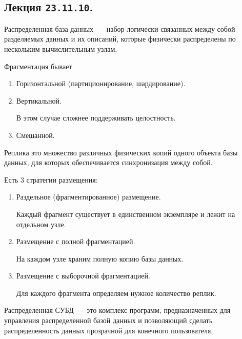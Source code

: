 \subsection{%
  Лекция \texttt{23.11.10}.%
}

\begin{definition}
  Распределенная база данных~--- набор логически связанных между собой
  разделяемых данных и их описаний, которые физически распределены по нескольким
  вычислительным узлам.
\end{definition}

Фрагментация бывает

\begin{enumerate}
\item
  Горизонтальной (партиционирование, шардирование).

\item
  Вертикальной.
  
  В этом случае сложнее поддерживать целостность.

\item
  Смешанной.
\end{enumerate}

\begin{definition}
  Реплика это множество различных физических копий одного объекта базы данных,
  для которых обеспечивается синхронизация между собой.
\end{definition}

Есть \(3\) стратегии размещения:

\begin{enumerate}
\item
  Раздельное (фрагментированное) размещение.

  Каждый фрагмент существует в единственном экземпляре и лежит на отдельном
  узле.

\item
  Размещение с полной фрагментацией.

  На каждом узле храним полную копию базы данных.

\item
  Размещение с выборочной фрагментацией.

  Для каждого фрагмента определяем нужное количество реплик.
\end{enumerate}

\begin{definition}
  Распределенная СУБД~--- это комплекс программ, предназначенных для управления
  распределенной базой данных и позволяющий сделать распределенность данных
  прозрачной для конечного пользователя.
\end{definition}


